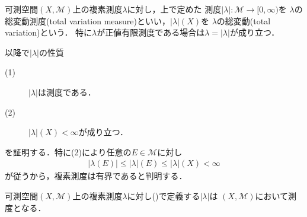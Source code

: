 	\begin{itembox}[l]{}
		\begin{dfn}
			可測空間$(X,\mathcal{M})$上の複素測度$\lambda$に対し，上で定めた
			測度$|\lambda|:\mathcal{M} \longrightarrow [0,\infty)$を
			$\lambda$の総変動測度(total variation measure)といい，$|\lambda|(X)$を
			$\lambda$の総変動(total variation)という．
			特に$\lambda$が正値有限測度である場合は$\lambda = |\lambda|$が成り立つ．\footnotemark
		\end{dfn}
	\end{itembox}
	
	以降で$|\lambda|$の性質
	\begin{description}
		\item[(1)] $|\lambda|$は測度である．
		\item[(2)] $|\lambda|(X) < \infty$が成り立つ．
	\end{description}
	を証明する．特に(2)により任意の$E \in \mathcal{M}$に対し
	\begin{align}
		|\lambda(E)| \leq |\lambda|(E) \leq |\lambda|(X) < \infty
	\end{align}
	が従うから，複素測度は有界であると判明する．

	\begin{itembox}[l]{}
		\begin{thm}
			可測空間$(X,\mathcal{M})$上の複素測度$\lambda$に対し()で定義する$|\lambda|$は
			$(X,\mathcal{M})$において測度となる．
		\end{thm}
	\end{itembox}
	
